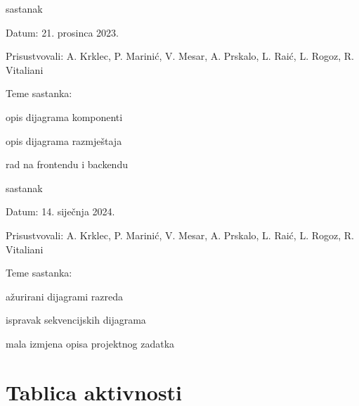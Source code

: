 \begin{packed_enum}
	\item  sastanak
	\item[] \begin{packed_item}
		\item Datum: 21. prosinca 2023.
		\item Prisustvovali: A. Krklec, P. Marinić, V. Mesar, A. Prskalo, L. Raić, L. Rogoz, R. Vitaliani
		\item Teme sastanka:
		\begin{packed_item}
			\item opis dijagrama komponenti
			\item opis dijagrama razmještaja
			\item rad na frontendu i backendu
		\end{packed_item}
	\end{packed_item}
	
	\item  sastanak
	\item[] \begin{packed_item}
		\item Datum: 14. siječnja 2024.
		\item Prisustvovali: A. Krklec, P. Marinić, V. Mesar, A. Prskalo, L. Raić, L. Rogoz, R. Vitaliani
		\item Teme sastanka:
		\begin{packed_item}
			\item ažurirani dijagrami razreda
			\item ispravak sekvencijskih dijagrama
			\item mala izmjena opisa projektnog zadatka
		\end{packed_item}
	\end{packed_item}
	
	
\end{packed_enum}

\eject
\section*{Tablica aktivnosti}

